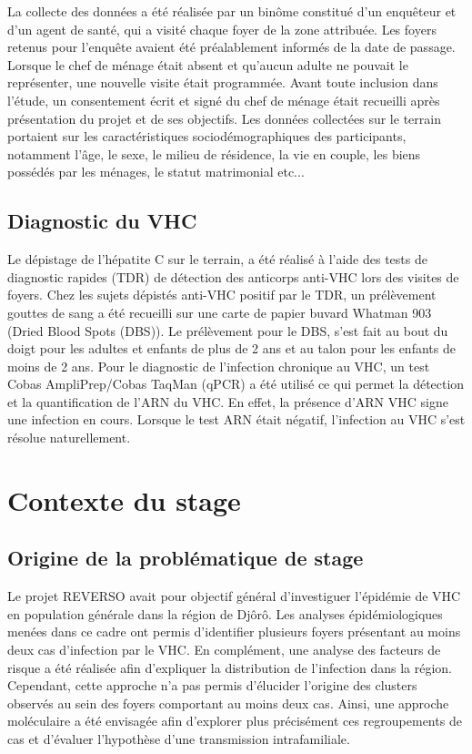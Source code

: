 \documentclass[a4paper,12pt]{article}
\begin{document}
La collecte des données a été réalisée par un binôme constitué d’un enquêteur et d’un agent de santé, qui a visité chaque foyer de la zone attribuée. Les foyers retenus pour l’enquête avaient été préalablement informés de la date de passage. Lorsque le chef de ménage était absent et qu’aucun adulte ne pouvait le représenter, une nouvelle visite était programmée. Avant toute inclusion dans l’étude, un consentement écrit et signé du chef de ménage était recueilli après présentation du projet et de ses objectifs. Les données collectées sur le terrain portaient sur les caractéristiques sociodémographiques des participants, notamment l’âge, le sexe, le milieu de résidence, la vie en couple, les biens possédés par les ménages, le statut matrimonial etc...

\subsection{Diagnostic du VHC}

Le dépistage de l’hépatite C sur le terrain, a été réalisé à l’aide des tests de diagnostic rapides (TDR) de détection des anticorps anti-VHC lors des visites de foyers. Chez les sujets dépistés anti-VHC positif par le TDR, un prélèvement gouttes de sang a été recueilli sur une carte de papier buvard Whatman 903 (Dried Blood Spots (DBS)). Le prélèvement pour le DBS, s’est fait au bout du doigt pour les adultes et enfants de plus de 2 ans et au talon pour les enfants de moins de 2 ans. Pour le diagnostic de l’infection chronique au VHC, un test Cobas AmpliPrep/Cobas TaqMan (qPCR) a été utilisé ce qui permet la détection et la quantification de l'ARN du VHC. En effet, la présence d’ARN VHC signe une infection en cours. Lorsque le test ARN était négatif, l’infection au VHC s’est résolue naturellement. 

\section {Contexte du stage}

\subsection{Origine de la problématique de stage}

Le projet REVERSO avait pour objectif général d’investiguer l’épidémie de VHC en population générale dans la région de Djôrô. Les analyses épidémiologiques menées dans ce cadre ont permis d’identifier plusieurs foyers présentant au moins deux cas d’infection par le VHC. En complément, une analyse des facteurs de risque a été réalisée afin d’expliquer la distribution de l’infection dans la région. Cependant, cette approche n’a pas permis d’élucider l’origine des clusters observés au sein des foyers comportant au moins deux cas. Ainsi, une approche moléculaire a été envisagée afin d’explorer plus précisément ces regroupements de cas et d’évaluer l’hypothèse d’une transmission intrafamiliale.
\end{document}
